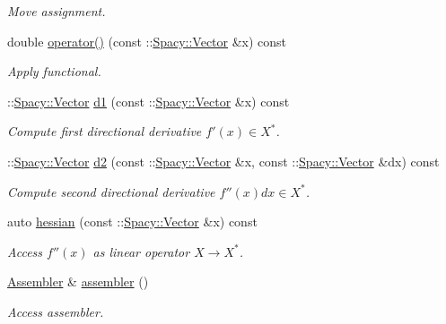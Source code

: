 \begin{DoxyCompactItemize}
\begin{DoxyCompactList}\small\item\em Move assignment. \end{DoxyCompactList}\item 
double \hyperlink{classSpacy_1_1Kaskade_1_1C2Functional_ae4a19339a3a69d26a9681b8900eebf09_ae4a19339a3a69d26a9681b8900eebf09}{operator()} (const \+::\hyperlink{classSpacy_1_1Vector}{Spacy\+::\+Vector} \&x) const 
\begin{DoxyCompactList}\small\item\em Apply functional. \end{DoxyCompactList}\item 
\+::\hyperlink{classSpacy_1_1Vector}{Spacy\+::\+Vector} \hyperlink{classSpacy_1_1Kaskade_1_1C2Functional_a69d3260b5313bd495e8f5871b15738db_a69d3260b5313bd495e8f5871b15738db}{d1} (const \+::\hyperlink{classSpacy_1_1Vector}{Spacy\+::\+Vector} \&x) const 
\begin{DoxyCompactList}\small\item\em Compute first directional derivative $f'(x) \in X^* $. \end{DoxyCompactList}\item 
\+::\hyperlink{classSpacy_1_1Vector}{Spacy\+::\+Vector} \hyperlink{classSpacy_1_1Kaskade_1_1C2Functional_a7bd6c110c1f954a92f43f6035787a9f0_a7bd6c110c1f954a92f43f6035787a9f0}{d2} (const \+::\hyperlink{classSpacy_1_1Vector}{Spacy\+::\+Vector} \&x, const \+::\hyperlink{classSpacy_1_1Vector}{Spacy\+::\+Vector} \&dx) const 
\begin{DoxyCompactList}\small\item\em Compute second directional derivative $f''(x)dx\in X^* $. \end{DoxyCompactList}\item 
auto \hyperlink{classSpacy_1_1Kaskade_1_1C2Functional_a73e0b9a2499e89bf85eddf1aa74fe9ba_a73e0b9a2499e89bf85eddf1aa74fe9ba}{hessian} (const \+::\hyperlink{classSpacy_1_1Vector}{Spacy\+::\+Vector} \&x) const 
\begin{DoxyCompactList}\small\item\em Access $f''(x)$ as linear operator $X\rightarrow X^*$. \end{DoxyCompactList}\item 
\hyperlink{classSpacy_1_1Kaskade_1_1C2Functional_ac4a1a2e519af22616ae7d6214c95b1ed}{Assembler} \& \hyperlink{classSpacy_1_1Kaskade_1_1C2Functional_abfe0b49280667ed0832589e1623f7293_abfe0b49280667ed0832589e1623f7293}{assembler} ()
\begin{DoxyCompactList}\small\item\em Access assembler. \end{DoxyCompactList}\item 

\end{DoxyCompactItemize}
